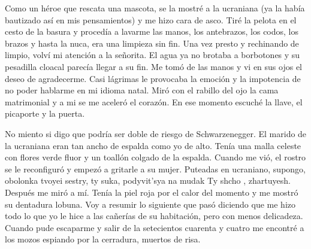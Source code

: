 \documentclass[11pt,twoside,openright,a6paper]{book}
\begin{document}
Como un héroe que rescata una mascota, se la mostré a la ucraniana (ya la
había bautizado así en mis pensamientos) y me hizo cara de asco. Tiré
la pelota en el cesto de la basura y procedía a lavarme las manos, los
antebrazos, los codos, los brazos y hasta la nuca, era una limpieza sin fin.
Una vez presto y rechinando de limpio, volví mi atención a la señorita. El
agua ya no brotaba a borbotones y su pesadilla cloacal parecía llegar a su
fin. Me tomó de las manos y vi en sus ojos el deseo de agradecerme. Casi
lágrimas le provocaba la emoción y la impotencia de no poder hablarme en
mi idioma natal. Miró con el rabillo del ojo la cama matrimonial y a mi
se me aceleró el corazón. En ese momento escuché la llave, el picaporte
y la puerta.

No miento si digo que podría ser doble de riesgo de Schwarzenegger. El
marido de la ucraniana eran tan ancho de espalda como yo de alto. Tenía
una malla celeste con flores verde fluor y un toallón colgado de la
espalda. Cuando me vió, el rostro se le reconfiguró y empezó a gritarle a
su mujer. Puteadas en ucraniano, supongo, obolonka tvoyei sestry, ty suka,
podyvit'sya na mudak Ty shcho , zhartuyesh. Después me miró a mí. Tenía
la piel roja por el calor del momento y me mostró su dentadura lobuna. Voy
a resumir lo siguiente que pasó diciendo que me hizo todo lo que yo le
hice a las cañerías de su habitación, pero con menos delicadeza. Cuando
pude escaparme y salir de la setecientos cuarenta y cuatro me encontré a
los mozos espiando por la cerradura, muertos de risa.
\end{document}
